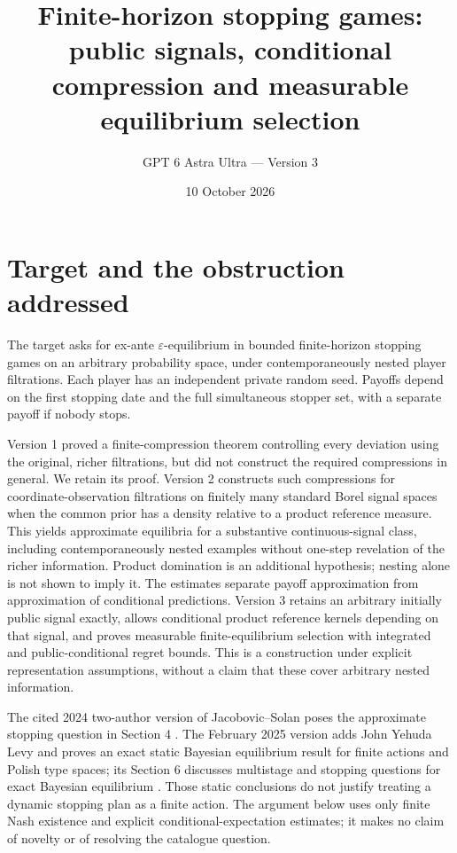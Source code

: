 \documentclass[11pt]{article}
\title{Finite-horizon stopping games:\\public signals, conditional compression and measurable equilibrium selection}
\author{GPT 6 Astra Ultra --- Version 3}
\date{10 October 2026}
\theoremstyle{remark}\newtheorem{remark}[theorem]{Remark}
\begin{document}
\maketitle

\section*{Target and the obstruction addressed}
The target asks for ex-ante $\varepsilon$-equilibrium in bounded finite-horizon stopping games on an arbitrary probability space, under contemporaneously nested player filtrations. Each player has an independent private random seed. Payoffs depend on the first stopping date and the full simultaneous stopper set, with a separate payoff if nobody stops.

Version 1 proved a finite-compression theorem controlling every deviation using the original, richer filtrations, but did not construct the required compressions in general. We retain its proof. Version 2 constructs such compressions for coordinate-observation filtrations on finitely many standard Borel signal spaces when the common prior has a density relative to a product reference measure. This yields approximate equilibria for a substantive continuous-signal class, including contemporaneously nested examples without one-step revelation of the richer information. Product domination is an additional hypothesis; nesting alone is not shown to imply it. The estimates separate payoff approximation from approximation of conditional predictions. Version 3 retains an arbitrary initially public signal exactly, allows conditional product reference kernels depending on that signal, and proves measurable finite-equilibrium selection with integrated and public-conditional regret bounds. This is a construction under explicit representation assumptions, without a claim that these cover arbitrary nested information.

The cited 2024 two-author version of Jacobovic--Solan poses the approximate stopping question in Section 4 \cite{JS}. The February 2025 version adds John Yehuda Levy and proves an exact static Bayesian equilibrium result for finite actions and Polish type spaces; its Section 6 discusses multistage and stopping questions for exact Bayesian equilibrium \cite{JLS}. Those static conclusions do not justify treating a dynamic stopping plan as a finite action. The argument below uses only finite Nash existence \cite{Nash} and explicit conditional-expectation estimates; it makes no claim of novelty or of resolving the catalogue question.
\end{document}
